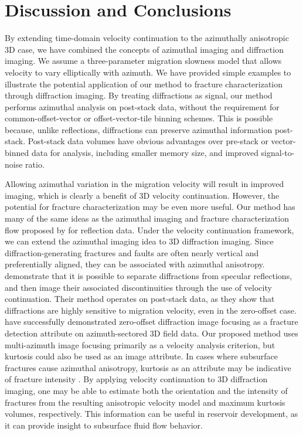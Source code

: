 \section{Discussion and Conclusions}
By extending time-domain velocity continuation to the azimuth\-ally anisotropic 3D case, we have combined the concepts of azimuthal imaging and diffraction imaging.  We assume a three-parameter migration slowness model that allows velocity to vary elliptically with azimuth.  We have provided simple examples to illustrate the potential application of our meth\-od to fracture characterization through diffraction imaging.  By treating diffractions as signal, our method performs azimuthal analysis on post-stack data, without the requirement for common-offset-vector or offset-vector-tile binning schemes.  This is possible because, unlike reflections, diffractions can preserve azimuthal information post-stack.  Post-stack data volumes have obvious advantages over pre-stack or vector-binned data for analysis, including smaller memory size, and improved signal-to-noise ratio.

Allowing azimuthal variation in the migration velocity will result in improved imaging, which is clearly a benefit of 3D velocity continuation.  However, the potential for fracture characterization may be even more useful.  Our method has many of the same ideas as the azimuthal imaging and fracture characterization flow proposed by \cite{sicking_nelan_mclain07} for reflection data.  
Under the velocity continuation framework, we can extend the azimuthal imaging idea to 3D diffraction imaging.  
Since diffraction-generating fractures and faults are often nearly vertical and preferentially aligned, they can be associated with azimuthal anisotropy. 
\cite{fomel_landa_taner07} demonstrate that it is possible to separate diffractions from specular reflections, and then image their associated discontinuities through the use of velocity continuation.  
Their method operates on post-stack data, as they show that diffractions are highly sensitive to migration velocity, even in the zero-offset case.
\cite{aldajani_fomel10} have successfully demonstrated zero-offset diffraction image focusing as a fracture detection attribute on azimuth-sectored 3D field data.
Our proposed method uses multi-azimuth image focusing primarily as a velocity analysis criterion, but kurtosis could also be used as an image attribute. 
In cases where subsurface fractures cause azimuthal anisotropy, kurtosis as an attribute may be indicative of fracture intensity \cite[]{aldajani_fomel10}.
By applying velocity continuation to 3D diffraction imaging, one may be able to estimate both the orientation and the intensity of fractures from the resulting anisotropic velocity model and maximum kurtosis volumes, respectively.  
This information can be useful in reservoir development, as it can provide insight to subsurface fluid flow behavior.  


